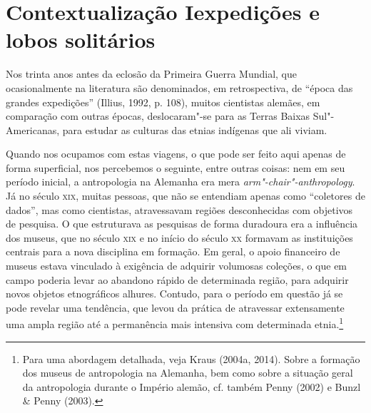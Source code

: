 \section{Contextualização I\break expedições e lobos solitários}

Nos trinta anos antes da eclosão da Primeira Guerra Mundial, que
ocasionalmente na literatura são denominados, em retrospectiva, de
``época das grandes expedições'' (Illius, 1992, p. 108), muitos
cientistas alemães, em comparação com outras épocas, deslocaram"-se para
as Terras Baixas Sul"-Americanas, para estudar as culturas das etnias
indígenas que ali viviam.

Quando nos ocupamos com estas viagens, o que pode ser feito aqui apenas
de forma superficial, nos percebemos o seguinte, entre outras coisas:
nem em seu período inicial, a antropologia na Alemanha era mera
\emph{arm"-chair"-anthropology}. Já no século \textsc{xix}, muitas pessoas, que não
se entendiam apenas como ``coletores de dados'', mas como cientistas,
atravessavam regiões desconhecidas com objetivos de pesquisa. O que
estruturava as pesquisas de forma duradoura era a influência dos
museus, que no século \textsc{xix} e no início do século \textsc{xx} formavam as
instituições centrais para a nova disciplina em formação. Em geral, o
apoio financeiro de museus estava vinculado à exigência de adquirir
volumosas coleções, o que em campo poderia levar ao abandono rápido de
determinada região, para adquirir novos objetos etnográficos alhures.
Contudo, para o período em questão já se pode revelar uma tendência, que
levou da prática de atravessar extensamente uma ampla região até a
permanência mais intensiva com determinada etnia.\footnote{Para uma
  abordagem detalhada, veja Kraus (2004a, 2014). Sobre a formação dos
  museus de antropologia na Alemanha, bem como sobre a situação geral
  da antropologia durante o Império alemão, cf. também Penny (2002) e
  Bunzl \& Penny (2003).}

